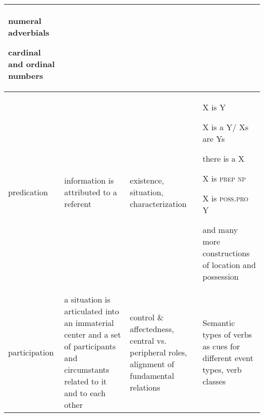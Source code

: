 \begin{table}
\begin{tabular}{p{2cm}p{3cm}p{3cm}p{3cm}}
numeral adverbials 

cardinal and ordinal numbers\\\hline
predication &
information is attributed to a referent &
existence, situation, characterization &
X is Y

X is a Y/ Xs are Ys

there is a X

X is \textsc{prep} \textsc{np}

X is \textsc{poss.pro} Y

and many more constructions of location and possession\\\hline
participation &
a situation is articulated into an immaterial center and a set of participants and circumstants related to it and to each other &
control \& affectedness, central vs. peripheral roles, alignment of fundamental relations &
Semantic types of verbs as cues for different event types, verb classes\\\hline

\end{tabular}
\end{table}


